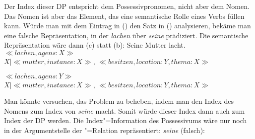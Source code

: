 \zs
Der Index dieser DP entspricht dem Possessivpronomen, nicht aber dem Nomen.
Das Nomen ist aber das Element, das eine semantische Rolle eines Verbs füllen kann.
Würde man mit dem Eintrag in () den Satz in () analysieren,
bekäme man eine falsche Repräsentation, in der \emph{lachen} über \emph{seine}
prädiziert. Die semantische Repräsentation wäre dann (c) statt (b):
\eal
\ex Seine Mutter lacht.
\ex $\ll lachen, agens:X\gg$\\
    $X|\ll mutter, instance:X\gg$, $\ll besitzen, location: Y, thema: X \gg$
   
\ex $\ll lachen, agens:Y\gg$\\
    $X|\ll mutter, instance:X\gg$, $\ll besitzen, location: Y, thema: X \gg$
\zl

\noindent
Man könnte versuchen, das Problem zu beheben, indem man den Index
des Nomens zum Index von \emph{seine} macht. Somit würde dieser Index
dann auch zum Index der DP werden. Die Index"=Information des Possessivums
wäre nur noch in der Argumentstelle der "=Relation
repräsentiert:
\eas
\textit{seine} (falsch):\\
\zs


